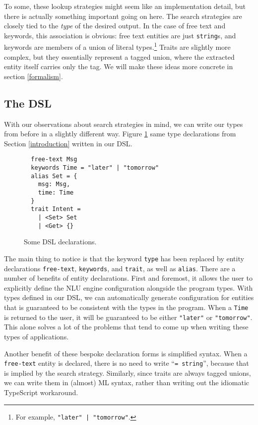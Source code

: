 \documentclass[twocolumn]{article}
\newcommand{\ts}[1]{\texttt{#1}}
\begin{document}
To some, these lookup strategies might seem like an implementation detail, but
there is actually something important going on here. The search strategies are
closely tied to the \emph{type} of the desired output. In the case of free text
and keywords, this association is obvious: free text entities are just
\ts{string}s, and keywords are members of a union of literal
types.\footnote{For example, \texttt{"later" | "tomorrow"}.} Traits are slightly
more complex, but they essentially represent a tagged union, where the extracted
entity itself carries only the tag. We will make these ideas more concrete in
section \ref{formalism}.

\subsection{The DSL}
With our observations about search strategies in mind, we can write our types
from before in a slightly different way. Figure \ref{fig:dsl_decls} same type
declarations from Section \ref{introduction} written in our DSL.

\begin{figure}
\begin{verbatim}
  free-text Msg
  keywords Time = "later" | "tomorrow"
  alias Set = {
    msg: Msg,
    time: Time
  }
  trait Intent =
    | <Set> Set
    | <Get> {}
\end{verbatim}
  \caption{Some DSL declarations.}
  \label{fig:dsl_decls}
\end{figure}

The main thing to notice is that the keyword \ts{type} has been replaced by
entity declarations \ts{free-text}, \ts{keywords}, and \ts{trait}, as well as
\ts{alias}. There are a number of benefits of entity declarations. First and
foremost, it allows the user to explicitly define the NLU engine configuration
alongside the program types. With types defined in our DSL, we can automatically
generate configuration for entities that is guaranteed to be consistent with the
types in the program. When a \ts{Time} is returned to the user, it will be
guaranteed to be either \ts{"later"} or \ts{"tomorrow"}. This alone solves a lot
of the problems that tend to come up when writing these types of applications.

Another benefit of these bespoke declaration forms is simplified syntax. When a
\ts{free-text} entity is declared, there is no need to write ``\ts{= string}'',
because that is implied by the search strategy. Similarly, since traits are
always tagged unions, we can write them in (almost) ML syntax, rather than
writing out the idiomatic TypeScript workaround.
\end{document}
